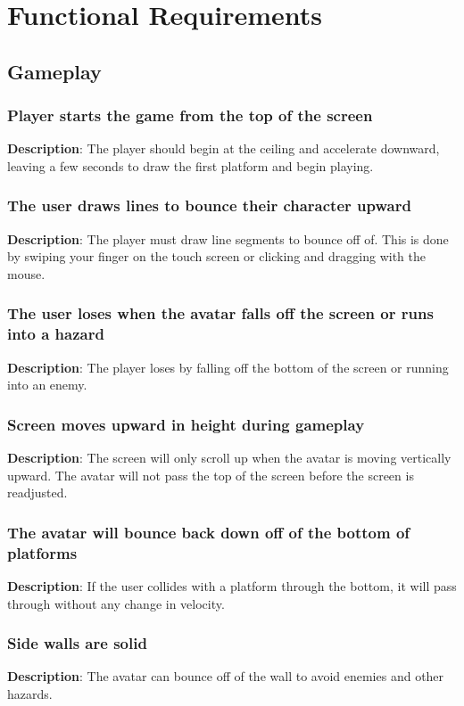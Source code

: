 \chapter{Functional Requirements}
\section{Gameplay}
\renewcommand{\thesubsection}{GAME-%
\ifnum\value{subsection}<10 0\fi
\arabic{subsection}}
\subsection{Player starts the game from the top of the screen}
\textbf{Description}: The player should begin at the ceiling and accelerate
downward, leaving a few seconds to draw the first platform and begin
playing.

\subsection{The user draws lines to bounce their character upward}
\textbf{Description}: The player must draw line segments to bounce
off of. This is done by swiping your finger on the touch screen or
clicking and dragging with the mouse.

\subsection{The user loses when the avatar falls off the screen or runs
into a hazard}
\textbf{Description}: The player loses by falling off the bottom of
the screen or running into an enemy.

\subsection{Screen moves upward in height during gameplay}
\textbf{Description}: The screen will only scroll up when the avatar
is moving vertically upward. The avatar will not pass the top of the
screen before the screen is readjusted.

\subsection{The avatar will bounce back down off of the bottom of platforms}
\textbf{Description}: If the user collides with a platform through
the bottom, it will pass through without any change in velocity.

\subsection{Side walls are solid}
\textbf{Description}: The avatar can bounce off of the wall to avoid enemies and other hazards.

